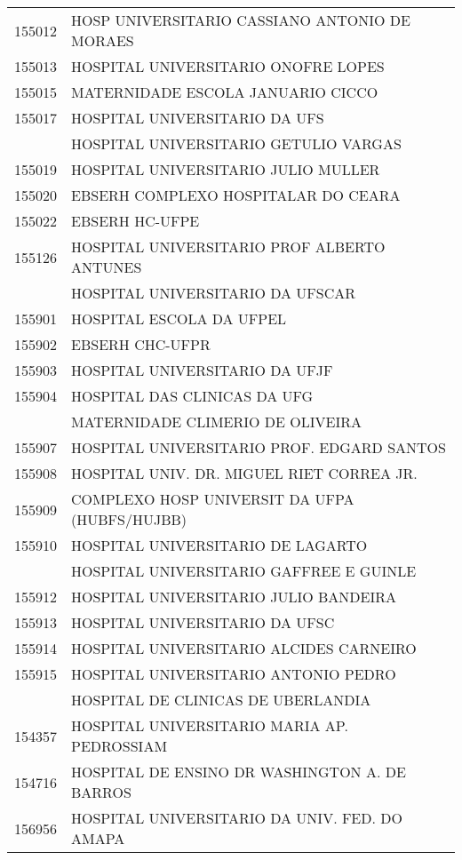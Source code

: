 \documentclass[
  letterpaper,
  DIV=11,
  numbers=noendperiod]{scrartcl}
\begin{document}
\begin{longtable}[t]{ll}
155012 & HOSP UNIVERSITARIO CASSIANO ANTONIO DE MORAES\\
155013 & HOSPITAL UNIVERSITARIO ONOFRE LOPES\\
155015 & MATERNIDADE ESCOLA JANUARIO CICCO\\
155017 & HOSPITAL UNIVERSITARIO DA UFS\\
\addlinespace
155018 & HOSPITAL UNIVERSITARIO GETULIO VARGAS\\
155019 & HOSPITAL UNIVERSITARIO JULIO MULLER\\
155020 & EBSERH COMPLEXO HOSPITALAR DO CEARA\\
155022 & EBSERH HC-UFPE\\
155126 & HOSPITAL UNIVERSITARIO PROF ALBERTO ANTUNES\\
\addlinespace
155900 & HOSPITAL UNIVERSITARIO DA UFSCAR\\
155901 & HOSPITAL ESCOLA DA UFPEL\\
155902 & EBSERH CHC-UFPR\\
155903 & HOSPITAL UNIVERSITARIO DA UFJF\\
155904 & HOSPITAL DAS CLINICAS DA UFG\\
\addlinespace
155906 & MATERNIDADE CLIMERIO DE OLIVEIRA\\
155907 & HOSPITAL UNIVERSITARIO PROF. EDGARD SANTOS\\
155908 & HOSPITAL UNIV. DR. MIGUEL RIET CORREA JR.\\
155909 & COMPLEXO HOSP UNIVERSIT DA UFPA (HUBFS/HUJBB)\\
155910 & HOSPITAL UNIVERSITARIO DE LAGARTO\\
\addlinespace
155911 & HOSPITAL UNIVERSITARIO GAFFREE E GUINLE\\
155912 & HOSPITAL UNIVERSITARIO JULIO BANDEIRA\\
155913 & HOSPITAL UNIVERSITARIO DA UFSC\\
155914 & HOSPITAL UNIVERSITARIO ALCIDES CARNEIRO\\
155915 & HOSPITAL UNIVERSITARIO ANTONIO PEDRO\\
\addlinespace
156654 & HOSPITAL DE CLINICAS DE UBERLANDIA\\
154357 & HOSPITAL UNIVERSITARIO MARIA AP. PEDROSSIAM\\
154716 & HOSPITAL DE ENSINO DR WASHINGTON A. DE BARROS\\
156956 & HOSPITAL UNIVERSITARIO DA UNIV. FED. DO AMAPA\\
\bottomrule
\end{longtable}
\end{document}
